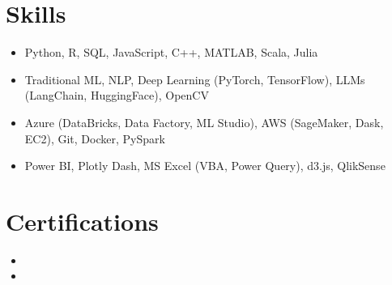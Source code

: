 \documentclass[letterpaper,11pt]{article}
\newcommand{\resumeItem}[1]{
\justifying
  \item{\fontsize{10.3pt}{11pt}\selectfont{#1}}
  \vspace{-2.7px}
}
\newcommand{\resumeItemListStart}{\begin{itemize}}
\newcommand{\resumeItemListEnd}{\end{itemize}}
\begin{document}
\vspace{-20pt}
\section{\large{Skills}}
\vspace{5pt}
\begin{itemize}[leftmargin=0.00in, label={}, itemsep=0pt, parsep=0pt]
    \item{
        {\fontsize{10.5pt}{13pt}\selectfont{Programming Languages:}}
        \small{Python, R, SQL, JavaScript, C++, MATLAB, Scala, Julia}
        }

    \item{
        {\fontsize{10.5pt}{13pt}\selectfont{AI and ML:}}
        \small{Traditional ML, NLP, Deep Learning (PyTorch, TensorFlow), LLMs (LangChain, HuggingFace), OpenCV}
        }

    \item{
        {\fontsize{10.5pt}{13pt}\selectfont{Cloud Data Tools:}}
        \small{Azure (DataBricks, Data Factory, ML Studio), AWS (SageMaker, Dask, EC2), Git, Docker, PySpark}
        }

    \item{
        {\fontsize{10.5pt}{13pt}\selectfont{Data Visualization:}}
        \small{Power BI, Plotly Dash, MS Excel (VBA, Power Query), d3.js, QlikSense}
        }
\end{itemize}

\vspace{-15pt}
\section{\large{Certifications}}
\vspace{5pt}
\resumeItemListStart
\resumeItem{AWS Certified Solutions Architect – Associate}
\hfill{\fontsize{10.3pt}{11pt}\selectfont{Amazon Web Services (expected Mar 2025)}}

\vspace{-7pt}
\resumeItem{AWS Certified Machine Learning – Associate}
\hfill{\fontsize{10.3pt}{11pt}\selectfont{Amazon Web Services (expected Apr 2025)}}
\resumeItemListEnd
\end{document}

